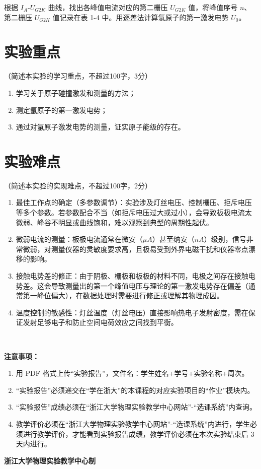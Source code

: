 \documentclass[10pt,a4paper]{ctexart}
\newcommand{\sihao}{\fontsize{14pt}{18pt}\selectfont}
\newcommand{\xiaosi}{\fontsize{12pt}{16pt}\selectfont}
\begin{document}
根据 $I_A \text{-} U_{G2K}$ 曲线，找出各峰值电流对应的第二栅压 $U_{G2K}$ 值，将峰值序号 $n$、第二栅压 $U_{G2K}$ 值记录在表 1-4 中。用逐差法计算氩原子的第一激发电势 $U_0$。
  
    
    \section{实验重点}

    \xiaosi（简述本实验的学习重点，不超过100字，3分）


 \begin{enumerate}   
        \item 学习关于原子碰撞激发和测量的方法；
        \item 测定氩原子的第一激发电势；
        \item 通过对氩原子激发电势的测量，证实原子能级的存在。

    \end{enumerate} 
    
    \section{实验难点}
    
    \xiaosi（简述本实验的实现难点，不超过100字，2分）

    \begin{enumerate}    
        \item 最佳工作点的确定（多参数调节）：实验涉及灯丝电压、控制栅压、拒斥电压等多个参数。若参数配合不当（如拒斥电压过大或过小），会导致板极电流太微弱、峰谷不明显或曲线饱和，难以观察到典型的周期性起伏。
        \item 微弱电流的测量：板极电流通常在微安（$\mu A$）甚至纳安（$nA$）级别，信号非常微弱，对测量仪器的灵敏度要求高，且极易受到外界电磁干扰和仪器零点漂移的影响。
        \item 接触电势差的修正：由于阴极、栅极和板极的材料不同，电极之间存在接触电势差。这会导致测量出的第一个峰值电压与理论的第一激发电势存在偏差（通常第一峰位偏大），在数据处理时需要进行修正或理解其物理成因。
        \item 温度控制的敏感性：灯丝温度（灯丝电压）直接影响热电子发射密度，需在保证发射足够电子和防止空间电荷效应之间找到平衡。
    \end{enumerate}  \



\newpage

\sihao\textbf{注意事项：}
\xiaosi
\begin{enumerate}
    \item  用 PDF 格式上传“实验报告”，文件名：学生姓名+学号+实验名称+周次。
    \item  “实验报告”必须递交在“学在浙大”的本课程的对应实验项目的“作业”模块内。
    \item  “实验报告”成绩必须在“浙江大学物理实验教学中心网站”-“选课系统”内查询。
    \item 教学评价必须在“浙江大学物理实验教学中心网站”-“选课系统”内进行，学生必须进行教学评价，才能看到实验报告成绩，教学评价必须在本次实验结束后 3 天内进行。
\end{enumerate}

\vspace{1cm}
\xiaosi\centering \textbf{浙江大学物理实验教学中心制}
\end{document}

